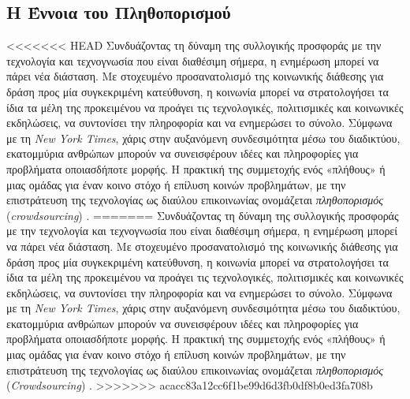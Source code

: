 \subsection{Η Έννοια του Πληθοπορισμού}
<<<<<<< HEAD
Συνδυάζοντας τη δύναμη της συλλογικής προσφοράς με την τεχνολογία και τεχνογνωσία που είναι διαθέσιμη σήμερα, η ενημέρωση μπορεί να πάρει νέα διάσταση. Με στοχευμένο προσανατολισμό της κοινωνικής διάθεσης για δράση προς μία συγκεκριμένη κατεύθυνση, η κοινωνία μπορεί να στρατολογήσει τα ίδια τα μέλη της προκειμένου να προάγει τις τεχνολογικές, πολιτισμικές και κοινωνικές εκδηλώσεις, να συντονίσει την πληροφορία και να ενημερώσει το σύνολο. Σύμφωνα με τη \textit{New York Times}, χάρις στην αυξανόμενη συνδεσιμότητα μέσω του διαδικτύου, εκατομμύρια ανθρώπων μπορούν να συνεισφέρουν ιδέες και πληροφορίες για προβλήματα οποιασδήποτε μορφής. Η πρακτική της συμμετοχής ενός «πλήθους» ή μιας ομάδας για έναν κοινο στόχο ή επίλυση κοινών προβλημάτων, με την επιστράτευση της τεχνολογίας ως διαύλου επικοινωνίας ονομάζεται \textit{πληθοπορισμός} (\textit{crowdsourcing}) \cite{[CSW+18]}.
=======
Συνδυάζοντας τη δύναμη της συλλογικής προσφοράς με την τεχνολογία και τεχνογνωσία που είναι διαθέσιμη σήμερα, η ενημέρωση μπορεί να πάρει νέα διάσταση. Με στοχευμένο προσανατολισμό της κοινωνικής διάθεσης για δράση προς μία συγκεκριμένη κατεύθυνση, η κοινωνία μπορεί να στρατολογήσει τα ίδια τα μέλη της προκειμένου να προάγει τις τεχνολογικές, πολιτισμικές και κοινωνικές εκδηλώσεις, να συντονίσει την πληροφορία και να ενημερώσει το σύνολο. Σύμφωνα με τη \textit{New York Times}, χάρις στην αυξανόμενη συνδεσιμότητα μέσω του διαδικτύου, εκατομμύρια ανθρώπων μπορούν να συνεισφέρουν ιδέες και πληροφορίες για προβλήματα οποιασδήποτε μορφής. Η πρακτική της συμμετοχής ενός «πλήθους» ή μιας ομάδας για έναν κοινο στόχο ή επίλυση κοινών προβλημάτων, με την επιστράτευση της τεχνολογίας ως διαύλου επικοινωνίας ονομάζεται \textit{πληθοπορισμός} (\textit{Crowdsourcing}) \cite{[CSW+18]}.
>>>>>>> acacc83a12cc6f1be99d6d3fb0df8b0ed3fa708b

